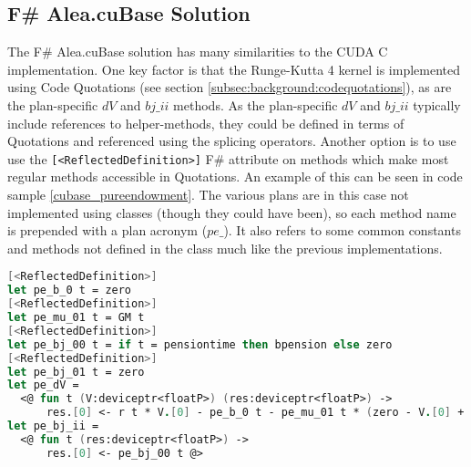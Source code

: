 \subsection{F\# Alea.cuBase Solution}
The F\# Alea.cuBase solution has many similarities to the CUDA C implementation.
One key factor is that the Runge-Kutta 4 kernel is implemented using Code Quotations (see section \ref{subsec:background:codequotations}), as are the plan-specific $dV$ and $bj\_ii$ methods.
As the plan-specific $dV$ and $bj\_ii$ typically include references to helper-methods, they could be defined in terms of Quotations and referenced using the splicing operators.
Another option is to use use the \lstinline$[<ReflectedDefinition>]$ F\# attribute on methods which make most regular methods accessible in Quotations.
An example of this can be seen in code sample \ref{cubase_pureendowment}. 
The various plans are in this case not implemented using classes (though they could have been), so each method name is prepended with a plan acronym ($pe\_$).
It also refers to some common constants and methods not defined in the class much like the previous implementations.
\clearpage
\begin{lstlisting}[language=FSharp, caption=The pure endowment insurance plan expressed in F\# Alea.cuBase, label=cubase_pureendowment]
[<ReflectedDefinition>] 
let pe_b_0 t = zero
[<ReflectedDefinition>]
let pe_mu_01 t = GM t
[<ReflectedDefinition>]
let pe_bj_00 t = if t = pensiontime then bpension else zero
[<ReflectedDefinition>]
let pe_bj_01 t = zero
let pe_dV = 
  <@ fun t (V:deviceptr<floatP>) (res:deviceptr<floatP>) -> 
      res.[0] <- r t * V.[0] - pe_b_0 t - pe_mu_01 t * (zero - V.[0] + pe_bj_01 t) @>
let pe_bj_ii = 
  <@ fun t (res:deviceptr<floatP>) ->
      res.[0] <- pe_bj_00 t @>
\end{lstlisting}

